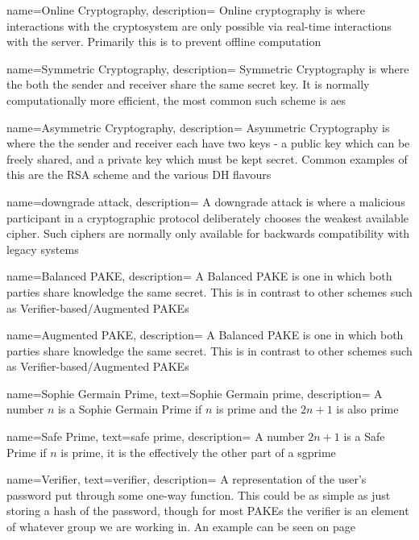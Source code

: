 \glsnoexpandfields

 {
  name={Online Cryptography},
  description={
    Online cryptography is where interactions with the cryptosystem are only possible
    via real-time interactions with the server. Primarily this is to prevent offline computation%
  }
}

 {
  name={Symmetric Cryptography},
  description={
    Symmetric Cryptography is where the both the sender and receiver share the same secret key. It is normally computationally more efficient, the most common such scheme is \gls{aes}%
  }
}

 {
  name={Asymmetric Cryptography},
  description={
    Asymmetric Cryptography is where the the sender and receiver each have two keys - a public key which can be freely shared, and a private key which must be kept secret. Common examples of this are the RSA scheme and the various DH flavours%
  }
}

 {
  name={downgrade attack},
  description={
    A downgrade attack is where a malicious participant in a cryptographic protocol deliberately chooses the weakest available cipher.
    Such ciphers are normally only available for backwards compatibility with legacy systems%
  }
}

 {
  name={Balanced PAKE},
  description={
    A Balanced PAKE is one in which both parties share knowledge the same secret.
    This is in contrast to other schemes such as Verifier-based/Augmented PAKEs%
  }
}

 {
  name={Augmented PAKE},
  description={
    A Balanced PAKE is one in which both parties share knowledge the same secret.
    This is in contrast to other schemes such as Verifier-based/Augmented PAKEs%
  }
}

 {
  name={Sophie Germain Prime},
  text={Sophie Germain prime},
  description={
    A number $n$ is a Sophie Germain Prime if $n$ is prime and the $2n+1$ is also prime%
  }
}

 {
  name={Safe Prime},
  text={safe prime},
  description={
    A number $2n+1$ is a Safe Prime if $n$ is prime, it is the effectively the other part of a \gls{sgprime}%
  }
}

 {
  name={Verifier},
  text={verifier},
  description={
    A representation of the user's password put through some one-way function.
    This could be as simple as just storing a hash of the password, though for most PAKEs the verifier is an element of whatever group we are working in.
    An example can be seen on page \pageref{text:srp-verifier-generation}%
  }
}

